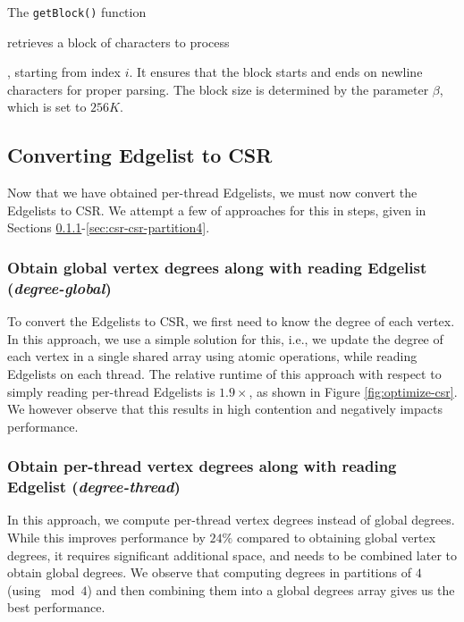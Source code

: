 The \texttt{getBlock()} function retrieves a block of characters to process, starting from index $i$. It ensures that the block starts and ends on newline characters for proper parsing. The block size is determined by the parameter $\beta$, which is set to $256K$.






\subsection{Converting Edgelist to CSR}

Now that we have obtained per-thread Edgelists, we must now convert the Edgelists to CSR. We attempt a few of approaches for this in steps, given in Sections \ref{sec:csr-degree-global}-\ref{sec:csr-csr-partition4}.


\subsubsection{Obtain global vertex degrees along with reading Edgelist (\textit{degree-global})}
\label{sec:csr-degree-global}

To convert the Edgelists to CSR, we first need to know the degree of each vertex. In this approach, we use a simple solution for this, i.e.,  we update the degree of each vertex in a single shared array using atomic operations, while reading Edgelists on each thread. The relative runtime of this approach with respect to simply reading per-thread Edgelists is $1.9\times$, as shown in Figure \ref{fig:optimize-csr}. We however observe that this results in high contention and negatively impacts performance.


\subsubsection{Obtain per-thread vertex degrees along with reading Edgelist (\textit{degree-thread})}
\label{sec:csr-degree-thread}

In this approach, we compute per-thread vertex degrees instead of global degrees. While this improves performance by $24\%$ compared to obtaining global vertex degrees, it requires significant additional space, and needs to be combined later to obtain global degrees. We observe that computing degrees in partitions of $4$ (using $\bmod 4$) and then combining them into a global degrees array gives us the best performance.


